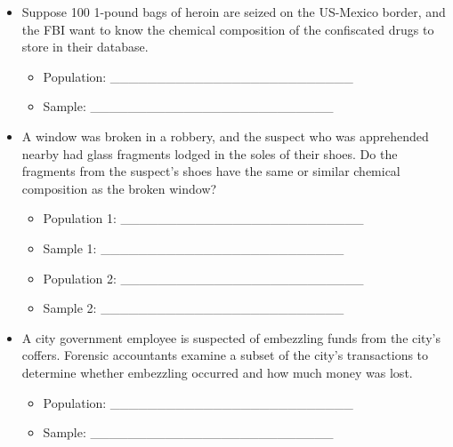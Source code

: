 \documentclass[]{book}
\providecommand{\tightlist}{%
  \setlength{\itemsep}{0pt}\setlength{\parskip}{0pt}}
\theoremstyle{definition}
\theoremstyle{definition}
\theoremstyle{remark}
\begin{document}
\begin{itemize}
\tightlist
\item
  Suppose 100 1-pound bags of heroin are seized on the US-Mexico border,
  and the FBI want to know the chemical composition of the confiscated
  drugs to store in their database.\vspace{.1in}

  \begin{itemize}
  \tightlist
  \item
    Population: \_\_\_\_\_\_\_\_\_\_\_\_\_\_\_\_\_\_\_\_\_\_\_\_\_\_
    \vspace{.1in}
  \item
    Sample: \_\_\_\_\_\_\_\_\_\_\_\_\_\_\_\_\_\_\_\_\_\_\_\_\_\_
    \vspace{.1in}
  \end{itemize}
\item
  A window was broken in a robbery, and the suspect who was apprehended
  nearby had glass fragments lodged in the soles of their shoes. Do the
  fragments from the suspect's shoes have the same or similar chemical
  composition as the broken window? \vspace{.1in}

  \begin{itemize}
  \tightlist
  \item
    Population 1: \_\_\_\_\_\_\_\_\_\_\_\_\_\_\_\_\_\_\_\_\_\_\_\_\_\_
    \vspace{.1in}
  \item
    Sample 1: \_\_\_\_\_\_\_\_\_\_\_\_\_\_\_\_\_\_\_\_\_\_\_\_\_\_\\
    \vspace{.1in}
  \item
    Population 2: \_\_\_\_\_\_\_\_\_\_\_\_\_\_\_\_\_\_\_\_\_\_\_\_\_\_
    \vspace{.1in}
  \item
    Sample 2: \_\_\_\_\_\_\_\_\_\_\_\_\_\_\_\_\_\_\_\_\_\_\_\_\_\_\\
    \vspace{.1in}
  \end{itemize}
\item
  A city government employee is suspected of embezzling funds from the
  city's coffers. Forensic accountants examine a subset of the city's
  transactions to determine whether embezzling occurred and how much
  money was lost. \vspace{.1in}

  \begin{itemize}
  \tightlist
  \item
    Population: \_\_\_\_\_\_\_\_\_\_\_\_\_\_\_\_\_\_\_\_\_\_\_\_\_\_
    \vspace{.1in}
  \item
    Sample: \_\_\_\_\_\_\_\_\_\_\_\_\_\_\_\_\_\_\_\_\_\_\_\_\_\_
  \end{itemize}
\end{itemize}
\end{document}
